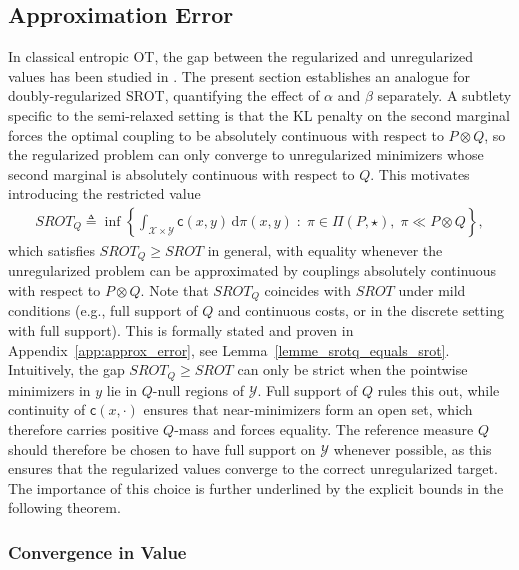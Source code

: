 \documentclass{article}
\begin{document}
\subsection{Approximation Error}
\label{sec:approx_error}

In classical entropic OT, the gap between the regularized and unregularized values has
been studied in \cite{carlier2017convergence, pal2024difference}. The present section
establishes an analogue for doubly-regularized SROT, quantifying the effect of $\alpha$
and $\beta$ separately. A subtlety specific to the semi-relaxed setting is that the KL
penalty on the second marginal forces the optimal coupling to be absolutely continuous
with respect to $P\otimes Q$, so the regularized problem can only converge to unregularized
minimizers whose second marginal is absolutely continuous with respect to $Q$. This
motivates introducing the restricted value
\begin{align}
  \label{eq:def_srot_q_main_text}
  SROT_Q
  \triangleq
  \inf\left\{
    \int_{\mathcal{X}\times\mathcal{Y}} \mathsf{c}(x,y)\,\mathrm{d}\pi(x,y)
    \;:\;
    \pi\in\Pi(P,\star),
    \;\pi\ll P\otimes Q
  \right\},
\end{align}
which satisfies $SROT_Q \geq SROT$ in general, with equality whenever the unregularized
problem can be approximated by couplings absolutely continuous with respect to $P\otimes Q$.
Note that $SROT_Q$ coincides with $SROT$ under mild conditions (e.g., full support of $Q$ and continuous costs, or in the discrete setting with full support). This is formally stated and proven in Appendix~\ref{app:approx_error}, see Lemma~\ref{lemme_srotq_equals_srot}.
Intuitively, the gap $SROT_Q \geq SROT$ can only be strict when the pointwise minimizers in $y$ lie in $Q$-null regions of $\mathcal{Y}$. Full support of $Q$ rules this out, while continuity of $\mathsf{c}(x,\cdot)$ ensures that near-minimizers form an open set, which therefore carries positive $Q$-mass and forces equality.
The reference measure $Q$ should therefore be chosen to have full support on
$\mathcal{Y}$ whenever possible, as this ensures that the regularized values converge to
the correct unregularized target. The importance of this choice is further underlined by
the explicit bounds in the following theorem.

\subsubsection{Convergence in Value}
\end{document}
